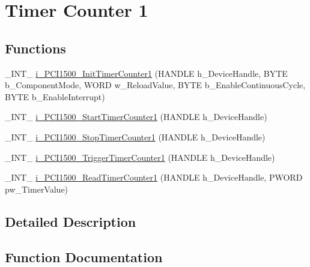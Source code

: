 \hypertarget{group___timer1}{}\section{Timer Counter 1}
\label{group___timer1}
\subsection*{Functions}
\begin{DoxyCompactItemize}
\item 
\+\_\+\+I\+N\+T\+\_\+ \mbox{\hyperlink{group___timer1_ga62ff7f0f6198fc54094def28db375c91}{i\+\_\+\+P\+C\+I1500\+\_\+\+Init\+Timer\+Counter1}} (H\+A\+N\+D\+LE h\+\_\+\+Device\+Handle, B\+Y\+TE b\+\_\+\+Component\+Mode, W\+O\+RD w\+\_\+\+Reload\+Value, B\+Y\+TE b\+\_\+\+Enable\+Continuous\+Cycle, B\+Y\+TE b\+\_\+\+Enable\+Interrupt)
\item 
\+\_\+\+I\+N\+T\+\_\+ \mbox{\hyperlink{group___timer1_ga390690b9d579daa7e7cc26b7d87318d2}{i\+\_\+\+P\+C\+I1500\+\_\+\+Start\+Timer\+Counter1}} (H\+A\+N\+D\+LE h\+\_\+\+Device\+Handle)
\item 
\+\_\+\+I\+N\+T\+\_\+ \mbox{\hyperlink{group___timer1_ga4e0110031bca63247ff23e9a2419f373}{i\+\_\+\+P\+C\+I1500\+\_\+\+Stop\+Timer\+Counter1}} (H\+A\+N\+D\+LE h\+\_\+\+Device\+Handle)
\item 
\+\_\+\+I\+N\+T\+\_\+ \mbox{\hyperlink{group___timer1_gae8b73b20d49abd82694eb9371d7e7c52}{i\+\_\+\+P\+C\+I1500\+\_\+\+Trigger\+Timer\+Counter1}} (H\+A\+N\+D\+LE h\+\_\+\+Device\+Handle)
\item 
\+\_\+\+I\+N\+T\+\_\+ \mbox{\hyperlink{group___timer1_ga21c9300b0e81aaaf7b8674710735c114}{i\+\_\+\+P\+C\+I1500\+\_\+\+Read\+Timer\+Counter1}} (H\+A\+N\+D\+LE h\+\_\+\+Device\+Handle, P\+W\+O\+RD pw\+\_\+\+Timer\+Value)
\end{DoxyCompactItemize}


\subsection{Detailed Description}


\subsection{Function Documentation}
\mbox{\label{group___timer1_ga62ff7f0f6198fc54094def28db375c91}} 
